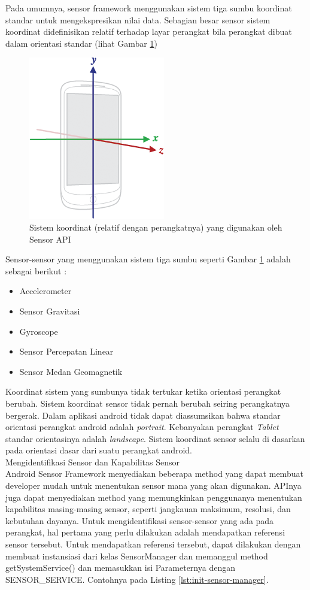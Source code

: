 \documentclass[a4paper,twoside]{article}
\begin{document}
\begin{enumerate}
\label{sssec:sistem_koordinat_sensor}
Pada umumnya, sensor framework menggunakan sistem tiga sumbu koordinat standar untuk mengekspresikan nilai data. Sebagian besar sensor sistem koordinat didefinisikan relatif terhadap layar perangkat bila perangkat dibuat dalam orientasi standar (lihat Gambar \ref{fig:axis-device})
\begin{figure}[htbp]
	\centering
		\includegraphics[scale=1]{Gambar/axis-device.png}
	\caption{Sistem koordinat (relatif dengan perangkatnya) yang digunakan oleh Sensor API}
	\label{fig:axis-device}
\end{figure}
Sensor-sensor yang menggunakan sistem tiga sumbu seperti Gambar \ref{fig:axis-device} adalah sebagai berikut :
\begin{itemize}
	\item Accelerometer
	\item Sensor Gravitasi
	\item Gyroscope
	\item Sensor Percepatan Linear
	\item Sensor Medan Geomagnetik
\end{itemize}
Koordinat sistem yang sumbunya tidak tertukar ketika orientasi perangkat berubah. Sistem koordinat sensor tidak pernah berubah seiring perangkatnya bergerak. Dalam aplikasi android tidak dapat diassumsikan bahwa standar orientasi perangkat android adalah \textit{portrait}. Kebanyakan perangkat \textit{Tablet} standar orientasinya adalah \textit{landscape}. Sistem koordinat sensor selalu di dasarkan pada orientasi dasar dari suatu perangkat android.\\

Mengidentifikasi Sensor dan Kapabilitas Sensor\\

\label{sssec:mengidentifikasi_sensor_dan_kapabilitas_sensor}
Android Sensor Framework menyediakan beberapa method yang dapat membuat developer mudah untuk menentukan sensor mana yang akan digunakan. APInya juga dapat menyediakan method yang memungkinkan penggunanya menentukan kapabilitas masing-masing sensor, seperti jangkauan maksimum, resolusi, dan kebutuhan dayanya.
Untuk mengidentifikasi sensor-sensor yang ada pada perangkat, hal pertama yang perlu dilakukan adalah mendapatkan referensi sensor tersebut. Untuk mendapatkan referensi tersebut, dapat dilakukan dengan membuat instansiasi dari kelas SensorManager dan memanggul method getSystemService() dan memasukkan isi Parameternya dengan SENSOR\_SERVICE. Contohnya pada Listing \ref{lst:init-sensor-manager}.
 

\end{enumerate}
\end{document}
